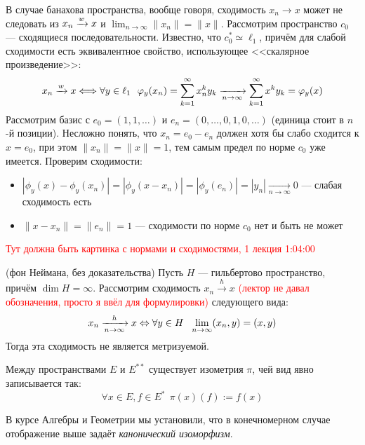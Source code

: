 \begin{anote}
	В случае банахова пространства, вообще говоря, сходимость $x_n \to x$ может не следовать из $x_n \xrightarrow{w} x$ и $\lim_{n \to \infty} \|x_n\| = \|x\|$. Рассмотрим пространство $c_0$ --- сходящиеся последовательности. Известно, что $c_0^* \simeq \ell_1$, причём для слабой сходимости есть эквивалентное свойство, использующее <<скалярное произведение>>:
	\[
		x_n \xrightarrow{w} x \Longleftrightarrow \forall y \in \ell_1\ \ \varphi_y(x_n) = \sum_{k = 1}^\infty x_n^ky_k \xrightarrow[n \to \infty]{} \sum_{k = 1}^\infty x^ky_k = \varphi_y(x)
	\]
	Рассмотрим базис с $e_0 = (1, 1, \ldots)$ и $e_n = (0, \ldots, 0, 1, 0, \ldots)$ (единица стоит в $n$-й позиции). Несложно понять, что $x_n = e_0 - e_n$ должен хотя бы слабо сходится к $x = e_0$, при этом $\|x_n\| = \|x\| = 1$, тем самым предел по норме $c_0$ уже имеется. Проверим сходимости:
	\begin{itemize}
		\item $|\phi_y(x) - \phi_y(x_n)| = |\phi_y(x - x_n)| = |\phi_y(e_n)| = |y_n| \xrightarrow[n \to \infty]{} 0$ --- слабая сходимость есть
		
		\item $\|x - x_n\| = \|e_n\| = 1$ --- сходимости по норме $c_0$ нет и быть не может
	\end{itemize}
\end{anote}

\textcolor{red}{Тут должна быть картинка с нормами и сходимостями, 1 лекция 1:04:00}

\begin{theorem} (фон Неймана, без доказательства)
	Пусть $H$ --- гильбертово пространство, причём $\dim H = \infty$. Рассмотрим сходимость $x_n \xrightarrow{h} x$ \textcolor{red}{(лектор не давал обозначения, просто я ввёл для формулировки)} следующего вида:
	\[
		x_n \xrightarrow[n \to \infty]{h} x \Leftrightarrow \forall y \in H\ \ \lim_{n \to \infty} (x_n, y) = (x, y)
	\]
	Тогда эта сходимость не является метризуемой.
\end{theorem}

\begin{theorem}
	Между пространствами $E$ и $E^{**}$ существует изометрия $\pi$, чей вид явно записывается так:
	\[
		\forall x \in E, f \in E^*\ \ \pi(x)(f) := f(x)
	\]
\end{theorem}

\begin{anote}
	В курсе Алгебры и Геометрии мы установили, что в конечномерном случае отображение выше задаёт \textit{канонический изоморфизм}.
\end{anote}

